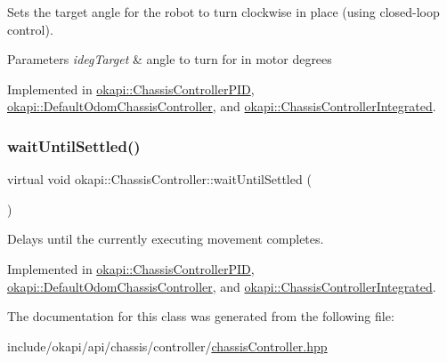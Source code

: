 Sets the target angle for the robot to turn clockwise in place (using closed-\/loop control).


\begin{DoxyParams}{Parameters}
{\em ideg\+Target} & angle to turn for in motor degrees \\
\hline
\end{DoxyParams}


Implemented in \mbox{\hyperlink{classokapi_1_1ChassisControllerPID_a3a16a11e8b0e11dbfb2a03b5685e509b}{okapi\+::\+Chassis\+Controller\+P\+ID}}, \mbox{\hyperlink{classokapi_1_1DefaultOdomChassisController_a948978204fc6f2a2443025dfdb0241b1}{okapi\+::\+Default\+Odom\+Chassis\+Controller}}, and \mbox{\hyperlink{classokapi_1_1ChassisControllerIntegrated_abd638be1352919fb211e9b70c181d940}{okapi\+::\+Chassis\+Controller\+Integrated}}.

\mbox{\label{classokapi_1_1ChassisController_a01ed4e0eb7332cc149228387bbf1e91c}} 
\subsubsection{\texorpdfstring{waitUntilSettled()}{waitUntilSettled()}}
{\footnotesize\ttfamily virtual void okapi\+::\+Chassis\+Controller\+::wait\+Until\+Settled (\begin{DoxyParamCaption}{ }\end{DoxyParamCaption})\hspace{0.3cm}{\ttfamily [pure virtual]}}

Delays until the currently executing movement completes. 

Implemented in \mbox{\hyperlink{classokapi_1_1ChassisControllerPID_a964cc8132bfa76492df0ee06aadb255a}{okapi\+::\+Chassis\+Controller\+P\+ID}}, \mbox{\hyperlink{classokapi_1_1DefaultOdomChassisController_a44599379129060bdb44e6f603ee5777b}{okapi\+::\+Default\+Odom\+Chassis\+Controller}}, and \mbox{\hyperlink{classokapi_1_1ChassisControllerIntegrated_a2af994f5ddc68a48d7692fd16ca590c0}{okapi\+::\+Chassis\+Controller\+Integrated}}.



The documentation for this class was generated from the following file\+:\begin{DoxyCompactItemize}
\item 
include/okapi/api/chassis/controller/\mbox{\hyperlink{chassisController_8hpp}{chassis\+Controller.\+hpp}}\end{DoxyCompactItemize}
